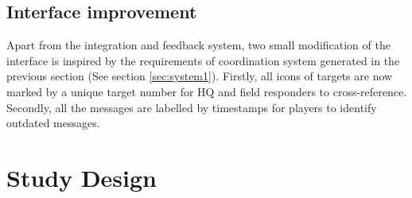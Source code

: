 \subsection{Interface improvement}
Apart from the integration and feedback system, two small modification of the interface is inspired by the requirements of coordination system generated in the previous section (See section \ref{sec:system1}). Firstly, all icons of targets are now marked by a unique target number for HQ and field responders to cross-reference. Secondly, all the messages are labelled by timestamps for players to identify outdated messages.\\

\section{Study Design}



